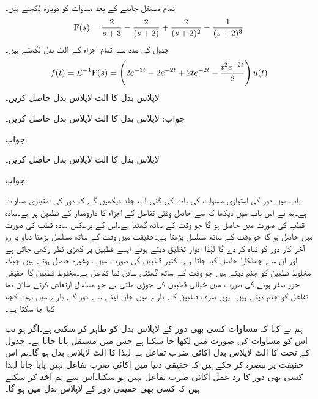 تمام مستقل جاننے کے بعد مساوات  کو دوبارہ لکھتے ہیں۔
\begin{align*}
{\ensuremath{{\textup{F}}}}(s)=\frac{2}{s+3}-\frac{2}{(s+2)}+\frac{2}{(s+2)^2}-\frac{1}{(s+2)^3}
\end{align*}
جدول  کی مدد سے تمام اجزاء کے الٹ بدل لکھتے ہیں۔
\begin{align*}
f(t)=\mathcal{L}^{-1}{{\textup{F}}}(s)=\left(2e^{-3t}-2e^{-2t}+2te^{-2t}-\frac{t^2 e^{-2t}}{2}\right)u(t)
\end{align*}
لاپلاس بدل  کا الٹ لاپلاس بدل حاصل کریں۔

جواب:
لاپلاس بدل  کا الٹ لاپلاس بدل حاصل کریں۔

جواب:

لاپلاس بدل  کا الٹ لاپلاس بدل حاصل کریں۔

جواب:

باب  میں دور کی امتیازی مساوات کی بات کی گئی۔آپ جلد دیکھیں گے کہ  دور کی امتیازی مساوات ہے۔ہم نے اس باب میں دیکھا کہ  سے حاصل وقتی تفاعل کے اجزاء کا دارومدار  کے قطبین پر ہے۔سادہ قطب  کی صورت میں   حاصل ہو گا جو وقت کے ساتھ گھٹتا ہے۔اس کے برعکس سادہ قطب  کی صورت میں  حاصل ہو گا جو وقت کے ساتھ مسلسل بڑھتا ہے۔حقیقت میں وقت کے ساتھ مسلسل بڑھتا دباو یا رو آخر کار دور کو تباہ کر دے گا لہٰذا ادوار تخلیق دیتے ہوئے ایسے قطبین پر کھڑی نظر رکھی جاتی ہے اور ان سے چھٹکارا حاصل کیا جاتا ہے۔ کثیر قطبین کی صورت میں ،  وغیرہ حاصل ہوتے ہیں جبکہ مخلوط قطبین   کو جنم دیتے ہیں جو وقت کے ساتھ گھٹتی سائن نما تفاعل ہے۔مخلوط قطبین کا حقیقی جزو صفر ہونے کی صورت میں خیالی قطبین کی جوڑی ملتی ہے جو مسلسل ارتعاش کرتے سائن نما تفاعل  کو جنم دیتے ہیں۔ یوں صرف قطبین کے بارے میں جان لینے سے دور کے بارے میں بہت کچھ کہا جا سکتا ہے۔

ہم نے  کہا کہ مساوات  کسی بھی دور کے لاپلاس بدل کو ظاہر کر سکتی ہے۔اگر  ہو تب اس  کو مساوات  کی صورت میں لکھا جا سکتا ہے جس میں مستقل  پایا جاتا ہے۔ جدول  کے تحت  کا الٹ لاپلاس بدل  اکائی ضرب تفاعل  ہے لہٰذا  کا الٹ لاپلاس بدل  ہو گا۔ہم اس حقیقت پر تبصرہ کر چکے ہیں کہ حقیقی دنیا میں اکائی ضرب تفاعل نہیں پایا جاتا لہٰذا کسی بھی دور کا رد عمل اکائی ضرب تفاعل نہیں ہو سکتا۔اس سے ہم اخذ کر سکتے ہیں کہ کسی بھی حقیقی دور کے لاپلاس بدل میں  ہو گا۔

